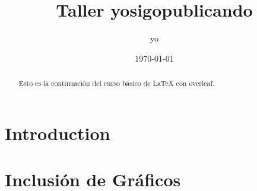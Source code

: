 \documentclass{article}
\title{Taller yosigopublicando}
\author{yo}
\date{\today}
\begin{document}
\maketitle

\section{Introduction}

\begin{abstract}
Esto es la continuación del curso básico de \LaTeX{} con overleaf.
\end{abstract}
\section{Inclusión de Gráficos}
\end{document}
